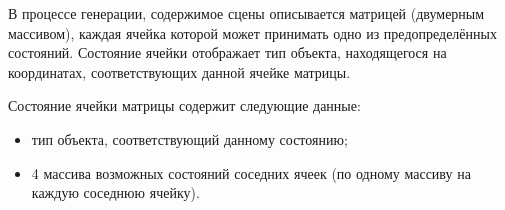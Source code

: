 В процессе генерации, содержимое сцены описывается матрицей (двумерным массивом), каждая ячейка которой может принимать одно из предопределённых состояний. Состояние ячейки отображает тип объекта, находящегося на координатах, соответствующих данной ячейке матрицы.

Состояние ячейки матрицы содержит следующие данные:
\begin{itemize}
    \item тип объекта, соответствующий данному состоянию;
    \item 4 массива возможных состояний соседних ячеек (по одному массиву на каждую соседнюю ячейку).
\end{itemize}
